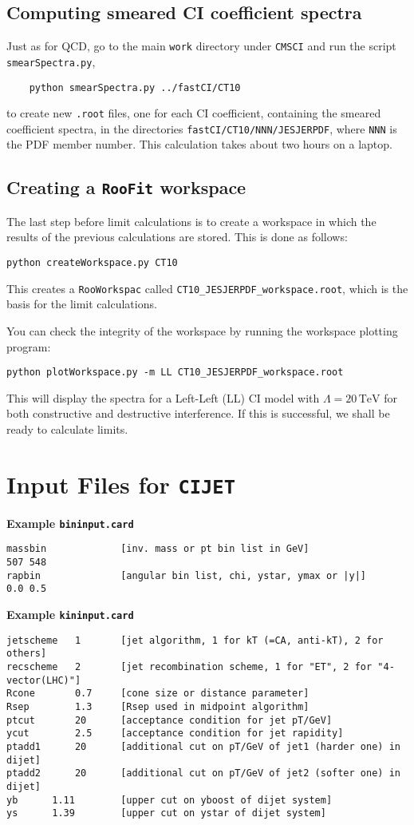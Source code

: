 \documentclass[aps,prd,preprint,nofootinbib]{revtex4}
\begin{document}
\subsection{Computing smeared CI coefficient spectra}
Just as for QCD, go to the main {\tt work} directory under {\tt CMSCI} and run the script
{\tt smearSpectra.py},
	\begin{verbatim}
	python smearSpectra.py ../fastCI/CT10
	\end{verbatim}
\noindent
to create new {\tt *.root} files, one for each CI coefficient, containing the smeared coefficient spectra, in the directories
{\tt fastCI/CT10/NNN/JESJERPDF}, where {\tt NNN} is the PDF member number.  This calculation  takes
about two hours on a laptop.

\subsection{Creating a {\tt RooFit} workspace}
The last step before limit calculations is to create a workspace in which the results of the previous
calculations are stored. This is done as follows:
\begin{verbatim}
python createWorkspace.py CT10
\end{verbatim}
This creates a {\tt RooWorkspac} called {\tt CT10\_JESJERPDF\_workspace.root}, which is the basis
for the limit calculations.


You can check the integrity of the workspace by running the workspace plotting program:
\begin{verbatim}
python plotWorkspace.py -m LL CT10_JESJERPDF_workspace.root
\end{verbatim}
This will display the spectra for a Left-Left (LL) CI model with $\Lambda = 20\,\text{TeV}$ for both
constructive and destructive interference. If this is successful, we shall be ready to calculate limits.

\section{Input Files for {\tt CIJET}}

{\bf Example {\tt bininput.card}}
	\begin{verbatim}
massbin         	[inv. mass or pt bin list in GeV]
507 548
rapbin          	[angular bin list, chi, ystar, ymax or |y|]
0.0 0.5
	\end{verbatim} 
	
{\bf Example {\tt kininput.card}}

	\begin{verbatim}
jetscheme	1		[jet algorithm, 1 for kT (=CA, anti-kT), 2 for others]
recscheme	2		[jet recombination scheme, 1 for "ET", 2 for "4-vector(LHC)"]
Rcone		0.7		[cone size or distance parameter]
Rsep		1.3		[Rsep used in midpoint algorithm]
ptcut		20		[acceptance condition for jet pT/GeV]
ycut		2.5		[acceptance condition for jet rapidity]
ptadd1		20		[additional cut on pT/GeV of jet1 (harder one) in dijet]
ptadd2		20		[additional cut on pT/GeV of jet2 (softer one) in dijet]
yb		1.11		[upper cut on yboost of dijet system]
ys		1.39		[upper cut on ystar of dijet system]
	\end{verbatim} 
	
\end{document}
